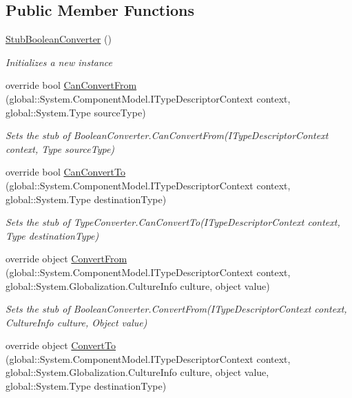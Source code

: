 \subsection*{Public Member Functions}
\begin{DoxyCompactItemize}
\item 
\hyperlink{class_system_1_1_component_model_1_1_fakes_1_1_stub_boolean_converter_a13165013b79e5ec40902ee3bc1b36b8b}{Stub\-Boolean\-Converter} ()
\begin{DoxyCompactList}\small\item\em Initializes a new instance\end{DoxyCompactList}\item 
override bool \hyperlink{class_system_1_1_component_model_1_1_fakes_1_1_stub_boolean_converter_ac1f643f6edea8a5cb6e6cdac1f667e2d}{Can\-Convert\-From} (global\-::\-System.\-Component\-Model.\-I\-Type\-Descriptor\-Context context, global\-::\-System.\-Type source\-Type)
\begin{DoxyCompactList}\small\item\em Sets the stub of Boolean\-Converter.\-Can\-Convert\-From(\-I\-Type\-Descriptor\-Context context, Type source\-Type)\end{DoxyCompactList}\item 
override bool \hyperlink{class_system_1_1_component_model_1_1_fakes_1_1_stub_boolean_converter_a48ce86e6f6ea073c8a46c52331f73755}{Can\-Convert\-To} (global\-::\-System.\-Component\-Model.\-I\-Type\-Descriptor\-Context context, global\-::\-System.\-Type destination\-Type)
\begin{DoxyCompactList}\small\item\em Sets the stub of Type\-Converter.\-Can\-Convert\-To(\-I\-Type\-Descriptor\-Context context, Type destination\-Type)\end{DoxyCompactList}\item 
override object \hyperlink{class_system_1_1_component_model_1_1_fakes_1_1_stub_boolean_converter_a26a767ab7d0f1e92b008289041f154c4}{Convert\-From} (global\-::\-System.\-Component\-Model.\-I\-Type\-Descriptor\-Context context, global\-::\-System.\-Globalization.\-Culture\-Info culture, object value)
\begin{DoxyCompactList}\small\item\em Sets the stub of Boolean\-Converter.\-Convert\-From(\-I\-Type\-Descriptor\-Context context, Culture\-Info culture, Object value)\end{DoxyCompactList}\item 
override object \hyperlink{class_system_1_1_component_model_1_1_fakes_1_1_stub_boolean_converter_a66f24c2872d6a9821a5fa0e9ec891a4d}{Convert\-To} (global\-::\-System.\-Component\-Model.\-I\-Type\-Descriptor\-Context context, global\-::\-System.\-Globalization.\-Culture\-Info culture, object value, global\-::\-System.\-Type destination\-Type)

\end{DoxyCompactItemize}
